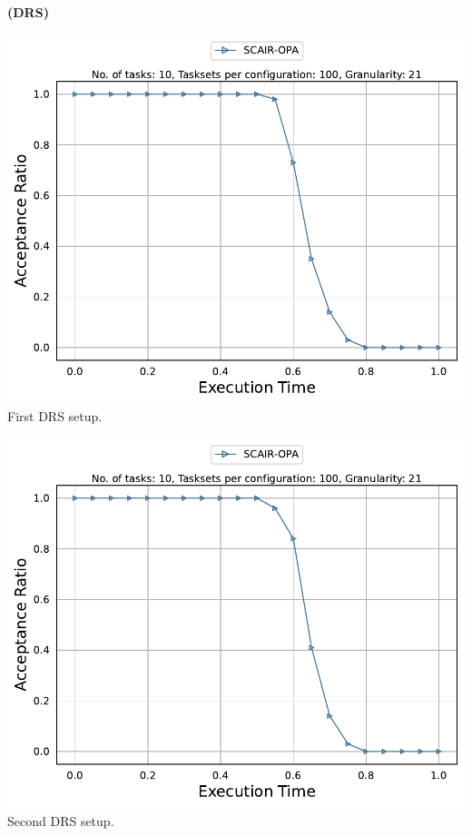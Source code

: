 \documentclass[]{article}
\begin{document}
	\begin{minipage}[t]{0.48\linewidth}
		\centering
		\textbf{(DRS)}
		\vspace{0.3cm}
		
		\includegraphics[width=\linewidth]{SCAIR-OPA[21][0.01-0.1][10].pdf}
		First DRS setup.
		\vspace{0.3cm}
		
		\includegraphics[width=\linewidth]{SCAIR-OPA_2nd.pdf}
		Second DRS setup.
		\vspace{0.3cm}


\end{minipage}
\end{document}
